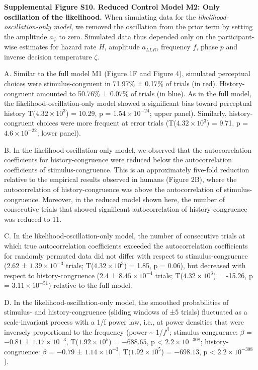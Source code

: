 \documentclass[
]{article}
\begin{document}
\textbf{Supplemental Figure S10. Reduced Control Model M2: Only
oscillation of the likelihood.} When simulating data for the
\emph{likelihood-oscillation-only model}, we removed the oscillation
from the prior term by setting the amplitude \(a_{\psi}\) to zero.
Simulated data thus depended only on the participant-wise estimates for
hazard rate \(H\), amplitude \(a_{LLR}\), frequency \(f\), phase \(p\)
and inverse decision temperature \(\zeta\).

A. Similar to the full model M1 (Figure 1F and Figure 4), simulated
perceptual choices were stimulus-congruent in 71.97\% ± 0.17\% of trials
(in red). History-congruent amounted to 50.76\% ± 0.07\% of trials (in
blue). As in the full model, the likelihood-oscillation-only model
showed a significant bias toward perceptual history
T(\ensuremath{4.32\times 10^{3}}) = 10.29, p =
\(\ensuremath{1.54\times 10^{-24}}\); upper panel). Similarly,
history-congruent choices were more frequent at error trials
(T(\ensuremath{4.32\times 10^{3}}) = 9.71, p =
\(\ensuremath{4.6\times 10^{-22}}\); lower panel).

B. In the likelihood-oscillation-only model, we observed that the
autocorrelation coefficients for history-congruence were reduced below
the autocorrelation coefficients of stimulus-congruence. This is an
approximately five-fold reduction relative to the empirical results
observed in humans (Figure 2B), where the autocorrelation of
history-congruence was above the autocorrelation of stimulus-congruence.
Moreover, in the reduced model shown here, the number of consecutive
trials that showed significant autocorrelation of history-congruence was
reduced to 11.

C. In the likelihood-oscillation-only model, the number of consecutive
trials at which true autocorrelation coefficients exceeded the
autocorrelation coefficients for randomly permuted data did not differ
with respect to stimulus-congruence (2.62 ±
\ensuremath{1.39\times 10^{-3}} trials;
T(\ensuremath{4.32\times 10^{3}}) = 1.85, p = \(0.06\)), but decreased
with respect to history-congruence (2.4 ±
\ensuremath{8.45\times 10^{-4}} trials;
T(\ensuremath{4.32\times 10^{3}}) = -15.26, p =
\(\ensuremath{3.11\times 10^{-51}}\)) relative to the full model.

D. In the likelihood-oscillation-only model, the smoothed probabilities
of stimulus- and history-congruence (sliding windows of ±5 trials)
fluctuated as a scale-invariant process with a 1/f power law, i.e., at
power densities that were inversely proportional to the frequency (power
\textasciitilde{} 1/\(f^\beta\); stimulus-congruence: \(\beta\) =
\(-0.81\) ± \(\ensuremath{1.17\times 10^{-3}}\),
T(\(\ensuremath{1.92\times 10^{5}}\)) = \(-688.65\), p < \(\ensuremath{2.2\times 10^{-308}}\);
history-congruence: \(\beta\) = \(-0.79\) ±
\(\ensuremath{1.14\times 10^{-3}}\),
T(\(\ensuremath{1.92\times 10^{5}}\)) = \(-698.13\), p < \(\ensuremath{2.2\times 10^{-308}}\)).
\end{document}
